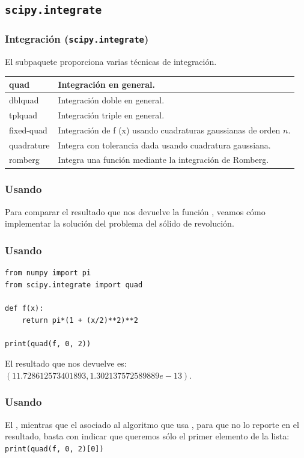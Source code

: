 \documentclass[12pt]{beamer}
\begin{document}
\subsection{\texttt{scipy.integrate}}

\begin{frame}
\frametitle{Integración (\texttt{scipy.integrate})}
El subpaquete  proporciona varias técnicas de integración.
\pause
\fontsize{12}{12}\selectfont
\begin{table}
\renewcommand{\arraystretch}{0.9}
\begin{tabular}{l | p{8cm}}
quad 		& Integración en general. \\ \hline
dblquad 	& Integración doble en general. \\ \hline
tplquad 	& Integración triple en general. \\ \hline
fixed-quad 	& Integración de f (x) usando cuadraturas gaussianas de orden $n$. \\ \hline
quadrature 	& Integra con tolerancia dada usando cuadratura gaussiana. \\ \hline
romberg 	& Integra una función mediante la integración de Romberg.
\end{tabular}
\end{table}
\end{frame}
\begin{frame}[fragile]
\frametitle{Usando }
Para comparar el resultado que nos devuelve la función , veamos cómo implementar la solución del problema del sólido de revolución.
\end{frame}
\begin{frame}[fragile]
\frametitle{Usando }
\begin{lstlisting}[caption=Integración con scipy]
from numpy import pi
from scipy.integrate import quad

def f(x):
    return pi*(1 + (x/2)**2)**2
   
print(quad(f, 0, 2))
\end{lstlisting}
\pause
El resultado que nos devuelve es: $(11.728612573401893, 1.302137572589889e-13)$.
\end{frame}
\begin{frame}[fragile]
\frametitle{Usando }
El , mientras que el  asociado al algoritmo que usa , para que no lo reporte en el resultado, basta con indicar que queremos sólo el primer elemento de la lista:
\\
\bigskip
\pause
\verb|print(quad(f, 0, 2)[0])|
\end{frame}
\end{document}
